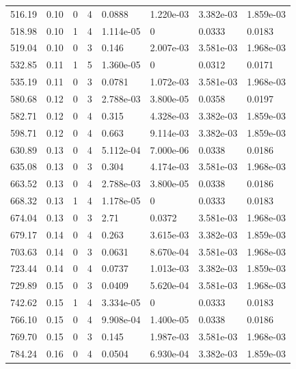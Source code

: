 \documentclass[preview]{standalone}
\begin{document}
{{{\begin{tabular}{L{1.2cm}C{1.2cm} C{0.3cm}C{0.5cm} C{1.4cm}C{1.4cm} C{1.4cm}C{1.4cm}}
  516.19  &  0.10  & 0     &  4 &  0.0888  & 1.220e-03  & 3.382e-03 &  1.859e-03   \\ 
  518.98  &  0.10  & 1     &  4 &  1.114e-05  & 0  & 0.0333 &  0.0183   \\ 
  519.04  &  0.10  & 0     &  3 &  0.146  & 2.007e-03  & 3.581e-03 &  1.968e-03   \\ 
  532.85  &  0.11  & 1     &  5 &  1.360e-05  & 0  & 0.0312 &  0.0171   \\ 
  535.19  &  0.11  & 0     &  3 &  0.0781  & 1.072e-03  & 3.581e-03 &  1.968e-03   \\ 
  580.68  &  0.12  & 0     &  3 &  2.788e-03  & 3.800e-05  & 0.0358 &  0.0197   \\ 
  582.71  &  0.12  & 0     &  4 &  0.315  & 4.328e-03  & 3.382e-03 &  1.859e-03   \\ 
  598.71  &  0.12  & 0     &  4 &  0.663  & 9.114e-03  & 3.382e-03 &  1.859e-03   \\ 
  630.89  &  0.13  & 0     &  4 &  5.112e-04  & 7.000e-06  & 0.0338 &  0.0186   \\ 
  635.08  &  0.13  & 0     &  3 &  0.304  & 4.174e-03  & 3.581e-03 &  1.968e-03   \\ 
  663.52  &  0.13  & 0     &  4 &  2.788e-03  & 3.800e-05  & 0.0338 &  0.0186   \\ 
  668.32  &  0.13  & 1     &  4 &  1.178e-05  & 0  & 0.0333 &  0.0183   \\ 
  674.04  &  0.13  & 0     &  3 &  2.71  & 0.0372  & 3.581e-03 &  1.968e-03   \\ 
  679.17  &  0.14  & 0     &  4 &  0.263  & 3.615e-03  & 3.382e-03 &  1.859e-03   \\ 
  703.63  &  0.14  & 0     &  3 &  0.0631  & 8.670e-04  & 3.581e-03 &  1.968e-03   \\ 
  723.44  &  0.14  & 0     &  4 &  0.0737  & 1.013e-03  & 3.382e-03 &  1.859e-03   \\ 
  729.89  &  0.15  & 0     &  3 &  0.0409  & 5.620e-04  & 3.581e-03 &  1.968e-03   \\ 
  742.62  &  0.15  & 1     &  4 &  3.334e-05  & 0  & 0.0333 &  0.0183   \\ 
  766.10  &  0.15  & 0     &  4 &  9.908e-04  & 1.400e-05  & 0.0338 &  0.0186   \\ 
  769.70  &  0.15  & 0     &  3 &  0.145  & 1.987e-03  & 3.581e-03 &  1.968e-03   \\ 
  784.24  &  0.16  & 0     &  4 &  0.0504  & 6.930e-04  & 3.382e-03 &  1.859e-03   \\ 

\end{tabular}}}}
\end{document}
